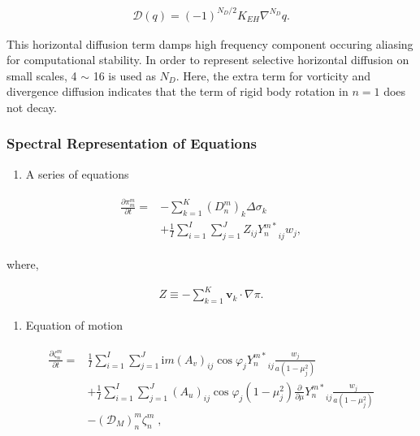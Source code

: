 \begin{eqnarray}
    {\mathcal D}(q) = (-1)^{N_D/2} K_{EH} \nabla^{N_D} q .
\end{eqnarray}

This horizontal diffusion term damps high frequency component occuring aliasing for computational stability. In order to represent selective horizontal diffusion on small scales, 4 \(\sim\) 16 is used
as \(N_D\). Here, the extra term for vorticity and divergence diffusion indicates that the term of rigid body rotation in \(n=1\) does not decay.

\hypertarget{spectral-representation-of-equations}{%
\subsubsection{Spectral Representation of Equations}\label{spectral-representation-of-equations}}

\begin{enumerate}
\def\labelenumi{\arabic{enumi}.}
\tightlist
\item
  A series of equations
\end{enumerate}

\begin{eqnarray}
\begin{aligned}
  \frac{\partial{\pi_m^m}}{\partial {t}}
  =  & - \sum_{k=1}^{K} (D_n^m)_k \Delta  \sigma_k \\
     & + \frac{1}{I} \sum_{i=1}^{I} \sum_{j=1}^{J}
               Z_{ij} {Y_n^{m *}}_{ij} w_j  ,
\end{aligned}
\end{eqnarray}

where,

\begin{eqnarray}
Z \equiv - \sum_{k=1}^{K} \mathbf{v}_k \cdot \nabla \pi .
\end{eqnarray}

\begin{enumerate}
\def\labelenumi{\arabic{enumi}.}
\setcounter{enumi}{1}
\tightlist
\item
  Equation of motion
\end{enumerate}

\begin{eqnarray}
\begin{aligned}
  \frac{\partial{\zeta_n^m}}{\partial {t}}
    =  & \frac{1}{I} \sum_{i=1}^{I} \sum_{j=1}^{J}
          \mathrm{i}m (A_v)_{ij} \cos\varphi_j
          {Y_n^{m *}}_{ij}
         \frac{w_j}{a(1-\mu_j^{2})}
         \\
    & +    \frac{1}{I} \sum_{i=1}^{I} \sum_{j=1}^{J}
          (A_u)_{ij} \cos\varphi_j
          (1-\mu_j^2)
          \frac{\partial }{\partial \mu} {Y_n^{m *}}_{ij}
          \frac{w_j}{a(1-\mu_j^{2})}
          \\
    & -   ({\mathcal D}_M)_n^m \zeta_n^m  \; ,
\end{aligned}
\end{eqnarray}

